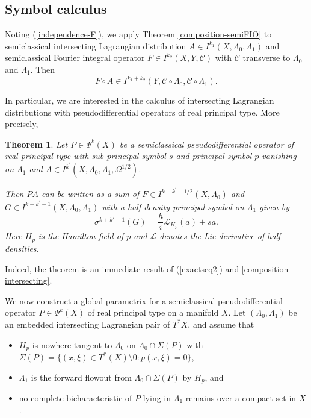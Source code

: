 \documentclass[10pt, a4paper, twoside]{amsart}
\numberwithin{equation}{section}
\newtheorem{theorem}{Theorem}
\theoremstyle{remark}
\begin{document}
\begin{appendix}
	
	
	\subsection{Symbol calculus}
	
	Noting (\ref{independence-F}), we apply Theorem \ref{composition-semiFIO} to semiclassical intersecting Lagrangian distribution $A \in I^{k_1}(X, \Lambda_0, \Lambda_1)$ and semiclassical Fourier integral operator $F \in I^{k_2}(X, Y, \mathcal{C})$ with $\mathcal{C}$ transverse to $\Lambda_0$ and $\Lambda_1$. Then \begin{equation}\label{composition-intersecting}F \circ A \in I^{k_1 + k_2}(Y, \mathcal{C} \circ \Lambda_0, \mathcal{C} \circ \Lambda_1).
	\end{equation}
	
	In particular, we are interested in the calculus of intersecting Lagrangian distributions with pseudodifferential operators of real principal type. More precisely,
	
	\begin{theorem}\label{principal symbol semiclassical intersecting}Let $P \in \Psi^{k}(X)$ be a semiclassical pseudodifferential operator of real principal type with sub-principal symbol $s$ and principal symbol $p$ vanishing on $\Lambda_1$ and $A \in I^{k^\prime}(X, \Lambda_0, \Lambda_1, \Omega^{1/2})$. 
	
	Then $PA$ can be written as a sum of $F \in I^{k + k^\prime - 1/2}(X, \Lambda_0)$ and $G \in I^{k + k^\prime - 1}(X, \Lambda_0, \Lambda_1)$ with a half density principal symbol on $\Lambda_1$ given by 
	\begin{equation}\label{vanishing-symbol-calculus} 
	\sigma^{k+k'-1}(G) = \frac{h}{i} \mathcal{L}_{H_{p}} (a) + s a.
	\end{equation} 
	Here $H_{p}$ is the Hamilton field of $p$ and $\mathcal{L}$ denotes the Lie derivative of half densities.
	\end{theorem}  
	
	Indeed, the theorem is an immediate result of  (\ref{exactseq2}) and \eqref{composition-intersecting}.
	
	We now construct a global parametrix for a semiclassical pseudodifferential operator $P \in \Psi^{k}(X)$ of real principal type on a manifold $X$. Let $(\Lambda_0, \Lambda_1)$ be an embedded intersecting Lagrangian pair of $T^\ast X$, and assume that 
	\begin{itemize}
	\item  $H_p$ is nowhere tangent to $\Lambda_0$ on $\Lambda_0 \cap \Sigma (P)$ with $\Sigma (P) = \{(x, \xi) \in T^\ast (X) \setminus 0 : p(x, \xi) = 0\}$, 
	\item $\Lambda_1$ is the forward flowout from $\Lambda_0 \cap \Sigma(P)$ by $H_p$, and 
	\item no complete bicharacteristic of $P$ lying in $\Lambda_1$ remains over a compact set in $X$. 
	\end{itemize}
		

\end{appendix}
\end{document}
